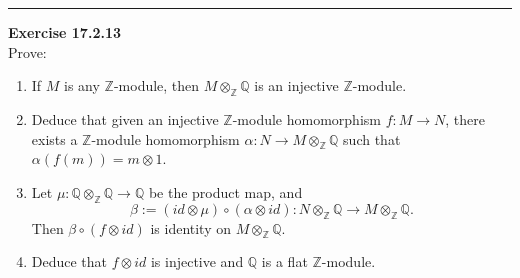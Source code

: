 \documentclass[a4paper, 12pt]{article}
\newenvironment{problem}[2][Exercise]
    { \begin{mdframed}[backgroundcolor=gray!20] \textbf{#1 #2} \\}
    {  \end{mdframed}}
\begin{document}
\noindent\rule{7in}{2.8pt}
\begin{problem}{17.2.13}
Prove:
\begin{enumerate}[(1)]
\item If \(M\) is any \(\mathbb{Z}\)-module, then \(M\otimes_{\mathbb{Z}}\mathbb{Q}\) is an injective \(\mathbb{Z}\)-module. 
\item Deduce that given an injective \(\mathbb{Z}\)-module homomorphism \(f:M\rightarrow N\), there exists a \(\mathbb{Z}\)-module homomorphism \(\alpha:N\rightarrow M\otimes_{\mathbb{Z}}\mathbb{Q}\) such that 
\(\alpha(f(m))=m\otimes 1\).
\item Let \(\mu:\mathbb{Q}\otimes_\mathbb{Z}\mathbb{Q}\rightarrow \mathbb{Q}\) be the product map, and 
\[\beta:=(id\otimes \mu)\circ (\alpha\otimes id):N\otimes_\mathbb{Z}\mathbb{Q}\rightarrow M\otimes_\mathbb{Z}\mathbb{Q}.\]
Then \(\beta\circ (f\otimes id)\) is identity on \(M\otimes_\mathbb{Z} \mathbb{Q}\). 
\item Deduce that \(f\otimes id\) is injective and \(\mathbb{Q}\) is a flat \(\mathbb{Z}\)-module.
\end{enumerate}
\end{problem}
\end{document}
